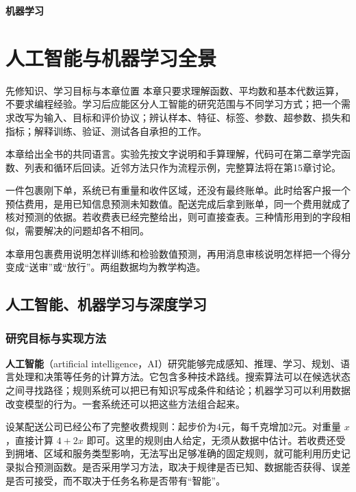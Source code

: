 \documentclass[UTF8,fontset=none,zihao=-4,a4paper]{ctexart}
\newcommand{\term}[1]{\textbf{#1}}
\numberwithin{equation}{section}
\numberwithin{figure}{section}
\begin{document}
\hypersetup{pageanchor=false}\begin{titlepage}\thispagestyle{empty}\vspace*{0.28\textheight}
\begin{center}{\fontsize{36}{45}\selectfont\bfseries 机器学习}\end{center}
\end{titlepage}
\hypersetup{pageanchor=true}\thispagestyle{empty}\tableofcontents
\clearpage{}

\section{人工智能与机器学习全景}\label{ch:panorama}
\begin{infobox}{先修知识、学习目标与本章位置}
本章只要求理解函数、平均数和基本代数运算，不要求编程经验。学习后应能区分人工智能的研究范围与不同学习方式；把一个需求改写为输入、目标和评价协议；辨认样本、特征、标签、参数、超参数、损失和指标；解释训练、验证、测试各自承担的工作。

本章给出全书的共同语言。实验先按文字说明和手算理解，代码可在第二章学完函数、列表和循环后回读。近邻方法只作为流程示例，完整算法将在第15章讨论。
\end{infobox}
一件包裹刚下单，系统已有重量和收件区域，还没有最终账单。此时给客户报一个预估费用，是用已知信息预测未知数值。配送完成后拿到账单，同一个费用就成了核对预测的依据。若收费表已经完整给出，则可直接查表。三种情形用到的字段相似，需要解决的问题却各不相同。

本章用包裹费用说明怎样训练和检验数值预测，再用消息审核说明怎样把一个得分变成“送审”或“放行”。两组数据均为教学构造。

\subsection{人工智能、机器学习与深度学习}
\subsubsection{研究目标与实现方法}
\term{人工智能}（artificial intelligence，AI）研究能够完成感知、推理、学习、规划、语言处理和决策等任务的计算方法。它包含多种技术路线。搜索算法可以在候选状态之间寻找路径；规则系统可以把已有知识写成条件和结论；机器学习可以利用数据改变模型的行为。一套系统还可以把这些方法组合起来。

设某配送公司已经公布了完整收费规则：起步价为4元，每千克增加2元。对重量 $x$，直接计算 $4+2x$ 即可。这里的规则由人给定，无须从数据中估计。若收费还受到拥堵、区域和服务类型影响，无法写出足够准确的固定规则，就可能利用历史记录拟合预测函数。是否采用学习方法，取决于规律是否已知、数据能否获得、误差是否可接受，而不取决于任务名称是否带有“智能”。
\end{document}

